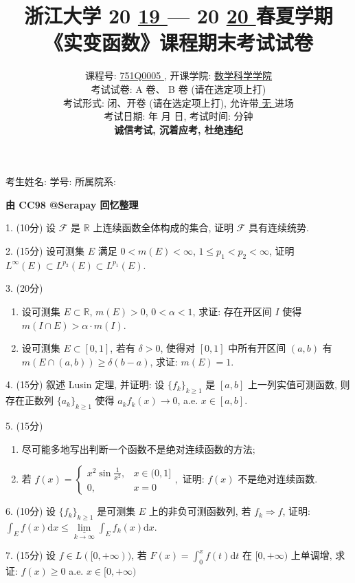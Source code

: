 \documentclass[UTF8]{ctexart}
\title{
\textbf{浙江大学 }20 \underline{ 19 } — 20 \underline{ 20 } \textbf{春夏学期} \\
\textbf{《实变函数》课程期末考试试卷}
}
\author{
课程号: \underline{ \quad 751Q0005 \quad }, 开课学院: \underline{ \quad 数学科学学院 \quad } \\
考试试卷: \checkmark A 卷、 B 卷 (请在选定项上打\checkmark) \\
考试形式: \checkmark 闭、开卷 (请在选定项上打\checkmark), 允许带\underline{ \quad 无 \quad  }进场 \\
考试日期: \underline{ \quad 2020 \quad } 年 \underline{ \quad 09 \quad } 月 \underline{ \quad 03 \quad } 日, 考试时间: \underline{ \quad 120 \quad }分钟 \\
\textbf{诚信考试, 沉着应考, 杜绝违纪}
}
\date{}
\renewcommand{\d}{\text{d}}
\begin{document}
\maketitle

\begin{center}
考生姓名: \underline{\quad\quad\quad\quad\quad\quad\quad\quad\quad}  学号: \underline{\quad\quad\quad\quad\quad\quad\quad\quad\quad}  所属院系: \underline{\quad\quad\quad\quad\quad\quad\quad\quad\quad}
\end{center}

\centerline{\Large{\textbf{由 CC98 @Serapay 回忆整理}}}

1. (10分) 设 $\mathcal{F}$ 是 $\mathbb{R}$ 上连续函数全体构成的集合, 证明 $\mathcal{F}$ 具有连续统势.

2. (15分) 设可测集 $E$ 满足 $0<m(E)<\infty$, $1\le p_1<p_2<\infty$, 证明 $L^\infty(E)\subset L^{p_2}(E)\subset L^{p_1}(E)$.

3. (20分)
\begin{enumerate}[(1)]
    \item 设可测集 $E\subset\mathbb{R}$, $m(E)>0$, $0<\alpha<1$, 求证: 存在开区间 $I$ 使得 $m(I\cap E)>\alpha\cdot m(I)$.
    \item 设可测集 $E\subset[0,1]$, 若有 $\delta>0$, 使得对 $[0,1]$ 中所有开区间 $(a,b)$ 有 $m(E\cap(a,b))\ge\delta(b-a)$, 求证: $m(E)=1$.
\end{enumerate}

4. (15分) 叙述 Lusin 定理, 并证明: 设 $\{f_k\}_{k\ge1}$ 是 $[a,b]$ 上一列实值可测函数, 则存在正数列 $\{a_k\}_{k\ge1}$ 使得 $a_kf_k(x)\to0$, a.e. $x\in[a,b]$.

5. (15分)
\begin{enumerate}[(1)]
    \item 尽可能多地写出判断一个函数不是绝对连续函数的方法;
    \item 若 $f(x)=\begin{cases}\displaystyle
        x^2\sin\frac{1}{x^2},& x\in(0,1]\\
        0, & x=0
    \end{cases},$ 证明: $f(x)$ 不是绝对连续函数.
\end{enumerate}

6. (10分) 设 $\{f_k\}_{k\ge1}$ 是可测集 $E$ 上的非负可测函数列, 若 $f_k\Rightarrow f$, 证明:
$\displaystyle\int_Ef(x)\d x\le\underset{k\to\infty}{\underline{\lim}}\int_Ef_k(x)\d x$.

7. (15分) 设 $f\in L([0,+\infty))$, 若 $\displaystyle F(x)=\int_0^xf(t)\d t$ 在 $[0,+\infty)$ 上单调增, 求证: $f(x)\ge0$ a.e. $x\in[0,+\infty)$
\end{document}
